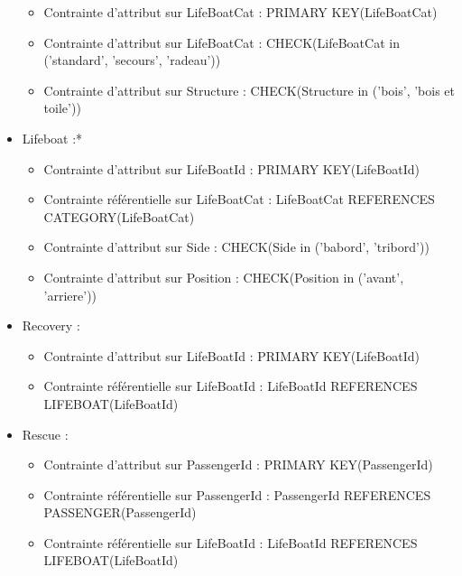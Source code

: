 \documentclass[12pt, a4paper, french]{article}
\begin{document}
\begin{sloppypar}
\begin{itemize}
\begin{itemize}
\item Contrainte d'attribut sur LifeBoatCat : PRIMARY KEY(LifeBoatCat)
\item Contrainte d'attribut sur LifeBoatCat : CHECK(LifeBoatCat in ('standard', 'secours', 'radeau'))
\item Contrainte d'attribut sur Structure : CHECK(Structure in ('bois', 'bois et toile'))
\end{itemize}
\item Lifeboat :*
\begin{itemize}
\item Contrainte d'attribut sur LifeBoatId : PRIMARY KEY(LifeBoatId)
\item Contrainte référentielle sur LifeBoatCat : LifeBoatCat REFERENCES CATEGORY(LifeBoatCat)
\item Contrainte d'attribut sur Side : CHECK(Side in ('babord', 'tribord'))
\item Contrainte d'attribut sur Position : CHECK(Position in ('avant', 'arriere'))
\end{itemize}
\item Recovery :
\begin{itemize}
\item Contrainte d'attribut sur LifeBoatId : PRIMARY KEY(LifeBoatId)
\item Contrainte référentielle sur LifeBoatId : LifeBoatId REFERENCES LIFEBOAT(LifeBoatId)
\end{itemize}
\item Rescue :
\begin{itemize}
\item Contrainte d'attribut sur PassengerId : PRIMARY KEY(PassengerId)
\item Contrainte référentielle sur PassengerId : PassengerId REFERENCES PASSENGER(PassengerId)
\item Contrainte référentielle sur LifeBoatId : LifeBoatId REFERENCES LIFEBOAT(LifeBoatId)
\end{itemize}

\end{itemize}
\end{sloppypar}
\end{document}
